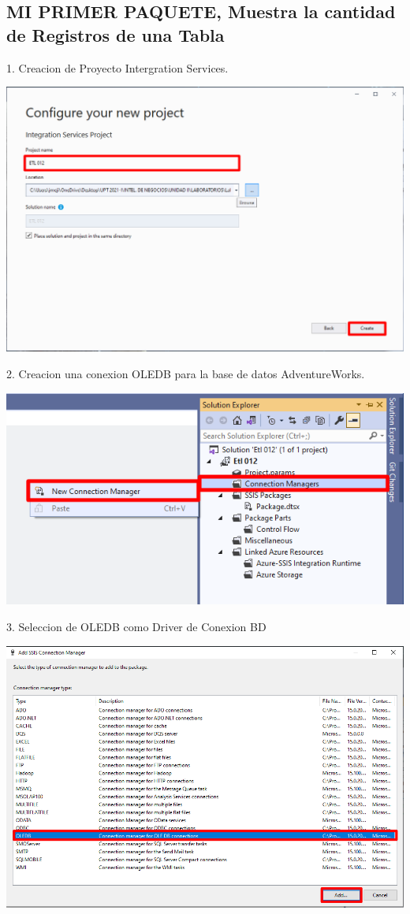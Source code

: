 \documentclass[12pt,letterpaper]{article}
\begin{document}
\subsection*{MI PRIMER PAQUETE, Muestra la cantidad de Registros de una Tabla}
1. Creacion de Proyecto Intergration Services.
	\begin{center}
	\includegraphics[width=14cm]{./img/27}
	\vspace{2cm}
	\end{center}	
2. Creacion una conexion OLEDB para la base de datos AdventureWorks.
	\begin{center}
	\includegraphics[width=14cm]{./img/28}
	\vspace{2cm}
	\end{center}
3. Seleccion de OLEDB como Driver de Conexion BD 
	\begin{center}
		\includegraphics[width=14cm]{./img/29}
		\vspace{2cm}
	\end{center}	
\end{document}

